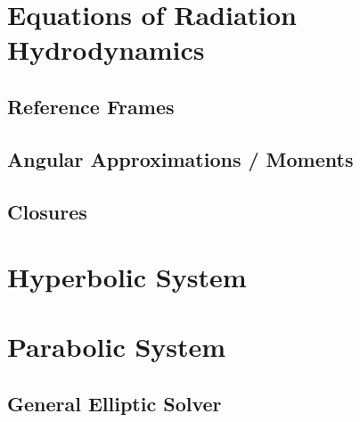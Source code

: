 \label{ch:radiation}

\section{Equations of Radiation Hydrodynamics}

\subsection{Reference Frames}

\subsection{Angular Approximations / Moments}

\subsection{Closures}



\section{Hyperbolic System}



\section{Parabolic System}

\subsection{General Elliptic Solver}


